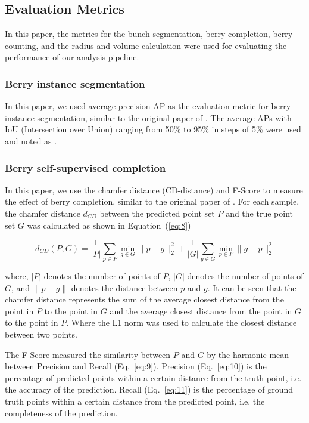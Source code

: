 \documentclass[12pt]{article}
\begin{document}
\subsection{Evaluation Metrics}

In this paper, the metrics for the bunch segmentation, berry completion, berry counting, and the radius and volume calculation were used for evaluating the performance of our analysis pipeline.

\subsubsection{Berry instance segmentation}
\label{sec:251}
In this paper, we used average precision AP as the evaluation metric for berry instance segmentation, similar to the original paper of  \citep{vu_softgroup_2022}. The average APs with IoU (Intersection over Union) ranging from 50\% to 95\% in steps of 5\% were used and noted as .

\subsubsection{Berry self-supervised completion}

In this paper, we use the chamfer distance (CD-distance) and F-Score to measure the effect of berry completion,  similar to the original paper of \citet{yu_pointr_2021}. 
For each sample, the chamfer distance $d_{CD}$ between the predicted point set $P$ and the true point set $G$ was calculated as shown in Equation~(\ref{eq:8})

\begin{equation}
    d_{CD}(P, G) = \frac{1}{|P|} \sum_{p \in P} \min_{g \in G} \|p - g\|_2^2 + \frac{1}{|G|} \sum_{g \in G} \min_{p \in P} \|g - p\|_2^2
    \label{eq:8}
\end{equation}

{\raggedright where, $|P|$ denotes the number of points of $P$, $|G|$ denotes the number of points of $G$, and $\|p - g\|$ denotes the distance between $p$ and $g$. 
It can be seen that the chamfer distance represents the sum of the average closest distance from the point in $P$ to the point in $G$ and the average closest distance from the point in $G$ to the point in $P$. Where the L1 norm was used to calculate the closest distance between two points.}

The F-Score measured the similarity between $P$ and $G$ by the harmonic mean between Precision and Recall (Eq.~\ref{eq:9}). 
Precision (Eq.~\ref{eq:10}) is the percentage of predicted points within a certain distance from the truth point, i.e. the accuracy of the prediction. Recall (Eq.~\ref{eq:11}) is the percentage of ground truth points within a certain distance from the predicted point, i.e. the completeness of the prediction. 
\end{document}
